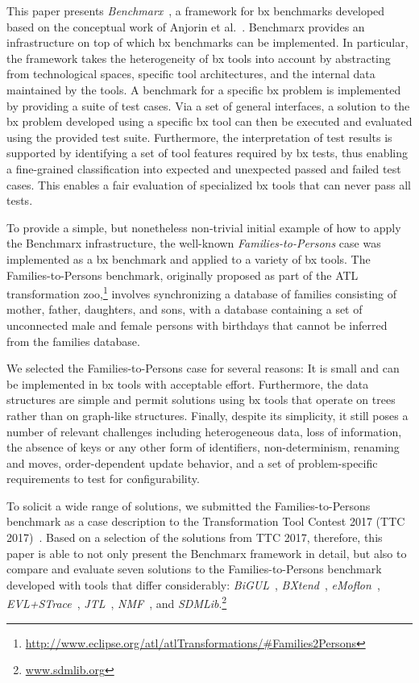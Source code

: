 This paper presents \emph{Benchmarx}~\cite{Anjorin2017}, a framework for bx benchmarks developed based on the conceptual work of Anjorin et al.~\cite{AnjorinCG0RS14}.
Benchmarx provides an infrastructure on top of which bx benchmarks can be implemented. 
In particular, the framework takes the heterogeneity of bx tools into account by abstracting from technological spaces, specific tool architectures, and the internal data maintained by the tools. 
A benchmark for a specific bx problem is implemented by providing a suite of test cases. 
Via a set of general interfaces, a solution to the bx problem developed using a specific bx tool can then be executed and evaluated using the provided test suite.  
Furthermore, the interpretation of test results is supported by identifying a set of tool features required by bx tests, thus enabling a fine-grained classification into expected and unexpected passed and failed test cases.
This enables a fair evaluation of specialized bx tools that can never pass all tests.

To provide a simple, but nonetheless non-trivial initial example of how to apply the Benchmarx infrastructure, the well-known \emph{Families-to-Persons} case was implemented as a bx benchmark and applied to a variety of bx tools. 
The Families-to-Persons benchmark, originally proposed as part of the ATL~\cite{SCP-Jouault2008} transformation zoo,\footnote{\url{http://www.eclipse.org/atl/atlTransformations/\#Families2Persons}} involves synchronizing a database of families consisting of mother, father, daughters, and sons, with a database containing a set of unconnected male and female persons with birthdays that cannot be inferred from the families database. 

We selected the Families-to-Persons case for several reasons: It is small and can be implemented in bx tools with acceptable effort. Furthermore, the data structures are simple and permit solutions using bx tools that operate on trees rather than on graph-like structures. 
Finally, despite its simplicity, it still poses a number of relevant challenges including heterogeneous data, loss of information, the absence of keys or any other form of identifiers, non-determinism, renaming and moves, order-dependent update behavior, and a set of problem-specific requirements to test for configurability.

To solicit a wide range of solutions, we submitted the Families-to-Persons benchmark as a case description to the Transformation Tool Contest 2017 (TTC 2017)~\cite{Anjorin2017a}.
Based on a selection of the solutions from TTC 2017, therefore, this paper is able to not only present the Benchmarx framework in detail, but also to compare and evaluate seven solutions to the Families-to-Persons benchmark developed with tools that differ considerably: 
\emph{BiGUL}~\cite{PEPM2016-Ko}, 
\emph{BXtend}~\cite{MODELSWARD2018-Buchmann}, 
\emph{eMoflon}~\cite{Leblebici2014a}, 
\emph{EVL+STrace}~\cite{IST2018-Samimi}, 
\emph{JTL}~\cite{SLE2010-Cicchetti}, 
\emph{NMF}~\cite{SoSyM2017-Hinkel}, and 
\emph{SDMLib}.\footnote{\url{www.sdmlib.org}}

